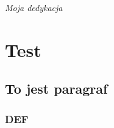 \documentclass[polski]{amuthesis}
\author{Bartłomiej Przybylski}
\date{Poznań, wrzesień 2017}
\begin{document}
\maketitle

\makestatement

\begin{streszczenie}
\lipsum[1]
\end{streszczenie}

\begin{abstract}
\lipsum[1]
\end{abstract}

\begin{dedykacja}
\emph{Moja dedykacja}
\end{dedykacja}

\tableofcontents

\chapter{Test}

\lipsum[1]

\section{To jest paragraf}

\lipsum[2-3]

\subsection{DEF}

\lipsum[4]
\end{document}
